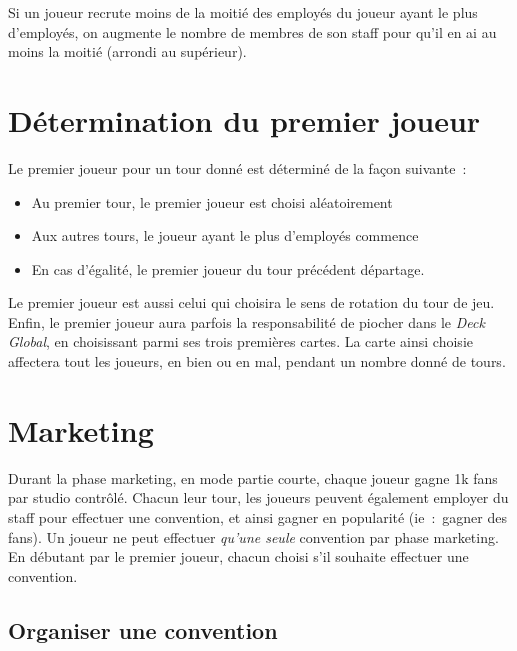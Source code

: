                 Si un joueur recrute moins de la moitié des employés du joueur ayant le plus d'employés, on augmente
                le nombre de membres de son staff pour qu'il en ai au moins la moitié (arrondi au supérieur).

        \section{Détermination du premier joueur}

            Le premier joueur pour un tour donné est déterminé de la façon suivante :
            \begin{itemize}
                \item Au premier tour, le premier joueur est choisi aléatoirement
                \item Aux autres tours, le joueur ayant le plus d'employés commence
                \item En cas d'égalité, le premier joueur du tour précédent départage.
            \end{itemize}

            Le premier joueur est aussi celui qui choisira le sens de rotation du tour de jeu.
            \newline
            Enfin, le premier joueur aura parfois la responsabilité de piocher dans le
            \emph{Deck Global}, en choisissant parmi ses trois premières cartes. La
            carte ainsi choisie affectera tout les joueurs, en bien ou en mal, pendant
            un nombre donné de tours.

        \section{Marketing}

            Durant la phase marketing, en mode partie courte, chaque joueur gagne 1k fans par
            studio contrôlé.
            \newline
            Chacun leur tour, les joueurs peuvent également employer du staff pour effectuer
            une convention, et ainsi gagner en popularité (ie : gagner des fans).
            Un joueur ne peut effectuer \emph{qu'une seule} convention par phase marketing.
            \newline
            En débutant par le premier joueur, chacun choisi s'il souhaite effectuer une convention.
            \subsection{Organiser une convention}

